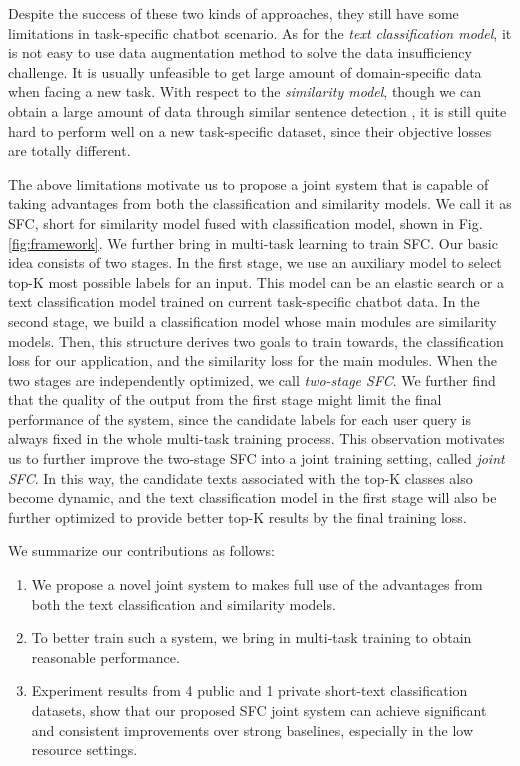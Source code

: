Despite  the  success  of  these two kinds of approaches, they still have some
limitations   in   task-specific  chatbot  scenario.  As  for  the  \emph{text
classification  model},  it  is  not  easy to use data augmentation method to
solve  the  data insufficiency challenge. It is usually unfeasible to
get  large amount of domain-specific data when facing a new task. With respect
to  the  \emph{similarity model}, though we can obtain a large amount of data
through similar sentence detection  \cite{sun2019fine},  it  is  still  quite  hard  to  perform well on
a new task-specific dataset,  since their objective losses are totally different. 

The  above  limitations motivate us to propose a joint system that is capable of
taking  advantages  from both the classification and similarity models. We call
it  as SFC,  short  for  similarity model fused with classification model, shown in
Fig.  \ref{fig:framework}.  We further bring in multi-task learning   \cite{caruana1993multitask,collobert2008unified,  liu2019multi} to train SFC.  
Our basic  idea  consists of two stages. In the first stage, we use an auxiliary model
to  select  top-K most possible labels for an input. This model can be an elastic
search  \cite{divya2013elasticsearch}  or a text classification model trained on
current   task-specific   chatbot   data.  In  the  second  stage,  we  build  a
classification  model  whose  main  modules  are  similarity  models. Then, this
structure  derives  two  goals to train towards, the classification loss for our
application,  and  the similarity loss for the main modules. When the two stages
are  independently optimized, we call \emph{two-stage SFC}. We further find that
the  quality of the output from the first stage might limit the final performance of the
system,  since  the  candidate labels for each user query is always fixed in the
whole  multi-task  training  process.  This  observation motivates us to further
improve  the  two-stage  SFC  into a joint training setting, called \emph{joint SFC}. In
this  way,  the  candidate texts associated  with the top-K classes also become
dynamic,  and  the  text  classification  model  in the first stage will also be
further optimized to provide better top-K results by the final training loss.


We summarize our contributions as follows:
\begin{enumerate}
  \item We propose a novel joint system to makes full use of
  the advantages from both the text classification and similarity models.

  \item To  better  train such a system, we bring in multi-task training to obtain
  reasonable performance.

  \item Experiment  results  from 4 public and 1 private short-text classification
  datasets,  show  that  our  proposed  SFC joint system can achieve significant
  and consistent improvements over strong baselines, especially in the low resource settings.
\end{enumerate}

